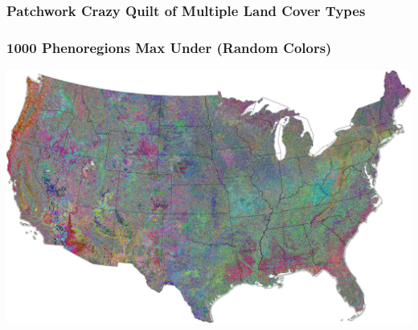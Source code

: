{
\begin{frame}
 \frametitle{Patchwork Crazy Quilt of Multiple Land Cover Types}
\end{frame}
}

\begin{frame}
 \frametitle{1000 Phenoregions Max Under (Random Colors)}
 \includegraphics[width=\textwidth]{figures/phendump.2000-2012.1000.maxunder.large.GIMP.pdf}
\end{frame}

